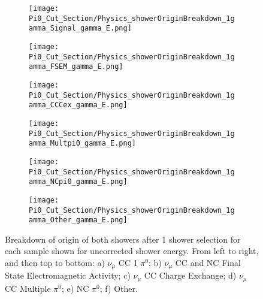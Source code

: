\begin{figure}[H]
\centering
  \begin{subfigure}[H]{0.25\textwidth}
    \centering
\texttt{[image: Pi0\_Cut\_Section/Physics\_showerOriginBreakdown\_1gamma\_Signal\_gamma\_E.png]}
  \caption{ }
  \end{subfigure} 
  \hspace{4mm}
  \begin{subfigure}[H]{0.25\textwidth}
    \centering
\texttt{[image: Pi0\_Cut\_Section/Physics\_showerOriginBreakdown\_1gamma\_FSEM\_gamma\_E.png]}
  \caption{ }
  \end{subfigure} 
  \hspace{4mm}
  \begin{subfigure}[H]{0.25\textwidth}
    \centering
\texttt{[image: Pi0\_Cut\_Section/Physics\_showerOriginBreakdown\_1gamma\_CCCex\_gamma\_E.png]}
  \caption{ }
  \end{subfigure} 
  \hspace{4mm}
  \begin{subfigure}[H]{0.25\textwidth}
    \centering
\texttt{[image: Pi0\_Cut\_Section/Physics\_showerOriginBreakdown\_1gamma\_Multpi0\_gamma\_E.png]}
  \caption{ }
  \end{subfigure} 
  \hspace{4mm}
  \begin{subfigure}[H]{0.25\textwidth}
    \centering
\texttt{[image: Pi0\_Cut\_Section/Physics\_showerOriginBreakdown\_1gamma\_NCpi0\_gamma\_E.png]}
  \caption{ }
  \end{subfigure} 
  \hspace{4mm}
  \begin{subfigure}[H]{0.25\textwidth}
    \centering
\texttt{[image: Pi0\_Cut\_Section/Physics\_showerOriginBreakdown\_1gamma\_Other\_gamma\_E.png]}
  \caption{ }
  \end{subfigure} 
\caption{ Breakdown of origin of both showers after 1 shower selection for each sample shown for uncorrected shower energy.  From left to right, and then top to bottom: a) $\nu_{\mu}$ CC 1 $\pi^0$; b) $\nu_\mu$ CC and NC Final State Electromagnetic Activity; c) $\nu_{\mu}$ CC Charge Exchange; d) $\nu_\mu$ CC Multiple $\pi^0$; e) NC $\pi^0$; f) Other.  }
\label{fig:physics_showerOriginBreakdown_E}
\end{figure}

